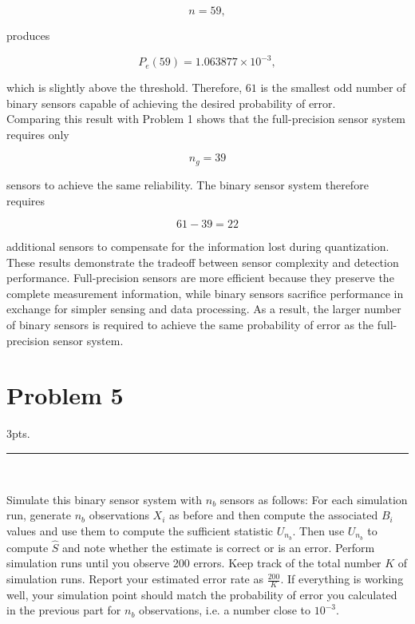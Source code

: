 \documentclass[12pt,a4paper]{article}
\begin{document}
\[
n=59,
\]

produces

\[
P_e(59)=1.063877\times10^{-3},
\]

which is slightly above the threshold. Therefore, \(61\) is the smallest odd number of binary sensors capable of achieving the desired probability of error.\\

Comparing this result with Problem 1 shows that the full-precision sensor system requires only

\[
n_g=39
\]

sensors to achieve the same reliability. The binary sensor system therefore requires

\[
61-39=22
\]

additional sensors to compensate for the information lost during quantization.\\

These results demonstrate the tradeoff between sensor complexity and detection performance. Full-precision sensors are more efficient because they preserve the complete measurement information, while binary sensors sacrifice performance in exchange for simpler sensing and data processing. As a result, the larger number of binary sensors is required to achieve the same probability of error as the full-precision sensor system. 

\clearpage

\section{Problem 5}
3pts.\\

\hrule 

\

\noindent Simulate this binary sensor system with $n_b$ sensors as follows: For each simulation run, generate $n_b$ observations $X_i$ as before and then compute the associated $B_i$ values and use them to compute the sufficient statistic $U_{n_b}$. Then use $U_{n_b}$ to compute $\hat{S}$ and note whether the estimate is correct or is an error. Perform simulation runs until you observe 200 errors. Keep track of the total number $K$ of simulation runs. Report your estimated error rate as $\frac{200}{K}$. If everything is working well, your simulation point should match the probability of error you calculated in the previous part for $n_b$ observations, i.e. a number close to $10^{-3}$.\\
\end{document}
